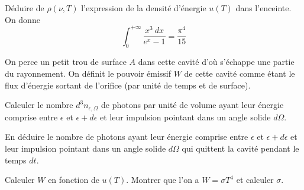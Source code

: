 \documentclass[utf8, 11pt]{feuille}
\begin{document}
\question
Déduire de $\rho(\nu, T)$ l'expression de la densité d'énergie $u(T)$ dans l'enceinte. On donne
$$
\int_0^{+\infty} \frac{x^3 \ dx}{e^x-1}=\frac{\pi^4}{15}
$$

\medskip

On perce un petit trou de surface $A$ dans cette cavité d'où s'échappe une partie du rayonnement. On définit le pouvoir émissif $W$ de cette cavité comme étant le flux d'énergie sortant de l'orifice (par unité de temps et de surface).

\question
Calculer le nombre $d^3 n_{\epsilon, \Omega}$ de photons par unité de volume ayant leur énergie comprise entre $\epsilon$ et $\epsilon+ d\epsilon$ et leur impulsion pointant dans un angle solide $d\Omega$.

\question
En déduire le nombre de photons ayant leur énergie comprise entre $\epsilon$ et $\epsilon+ d\epsilon$ et leur impulsion pointant dans un angle solide $d\Omega$ qui quittent la cavité pendant le temps $dt$. 

\question
Calculer $W$ en fonction de $u(T)$.  Montrer que l'on a $W=\sigma T^4$ et calculer $\sigma$.
\end{document}
